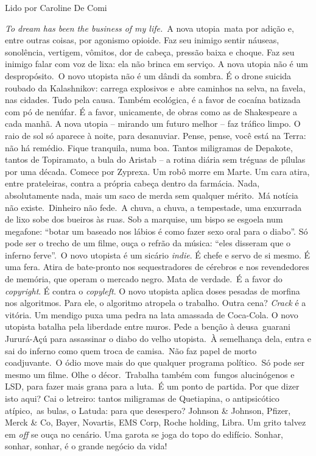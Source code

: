 Lido por Caroline De Comi

\bigskip

\emph{To dream has been the business of my life.}~A nova utopia~mata por
adição e, entre outras coisas, por agonismo opioide. Faz seu inimigo
sentir náuseas, sonolência, vertigem, vômitos, dor de cabeça, pressão
baixa e choque. Faz seu inimigo falar com voz de lixa: ela não brinca em
serviço. A nova utopia não é um despropósito.~O novo utopista não é um
dândi da sombra. É o drone suicida roubado da Kalashnikov: carrega
explosivos e~abre caminhos na selva, na favela, nas cidades. Tudo pela
causa. Também ecológica, é a favor de cocaína batizada com pó de
nenúfar. É a favor, unicamente, de obras como as de Shakespeare a cada
manhã. A nova utopia -- mirando um futuro melhor -- faz tráfico limpo. O
raio de sol só aparece à noite, para desanuviar. Pense, pense, você está
na Terra: não há remédio. Fique tranquila, numa boa. Tantos miligramas
de Depakote, tantos de Topiramato, a bula do Aristab -- a rotina diária
sem tréguas de pílulas por uma década. Comece por Zyprexa. Um robô morre
em Marte. Um cara atira, entre prateleiras, contra a própria cabeça
dentro da farmácia. Nada, absolutamente nada, mais um saco de merda sem
qualquer mérito.~Má notícia não existe.~Dinheiro não fede.~A chuva, a
chuva, a tempestade, uma enxurrada de lixo sobe dos bueiros às ruas. Sob
a marquise, um bispo se esgoela num megafone: ``botar um baseado nos
lábios é como fazer sexo oral para o diabo''. Só pode ser o trecho de um
filme, ouça o refrão da música: ``eles disseram que o inferno ferve''.~O
novo utopista é um sicário \emph{indie}. É chefe e servo de si mesmo. É
uma fera. Atira de bate-pronto nos sequestradores de cérebros e nos
revendedores de memória, que operam o mercado negro. Mata de verdade.~É
a favor do \emph{copyright}. É contra o \emph{copyleft}. O novo utopista
aplica doses pesadas de morfina nos algoritmos. Para ele, o algoritmo
atropela o trabalho. Outra cena? \emph{Crack} é a vitória. Um mendigo
puxa uma pedra na lata amassada de Coca-Cola. O novo utopista batalha
pela liberdade entre muros. Pede a benção à deusa~guarani Jururá-Açú
para assassinar o diabo do velho utopista.~À semelhança dela, entra e
sai do inferno como quem troca de camisa.~Não faz papel de morto
coadjuvante.~O ódio move mais do que qualquer programa político.~Só pode
ser mesmo um filme. Olhe o décor.~Trabalha também com~fungos
alucinógenos e LSD, para fazer mais grana para a luta.~É um ponto de
partida. Por que dizer isto aqui? Cai o letreiro: tantos miligramas de
Quetiapina, o antipsicótico atípico,~as bulas, o Latuda: para que
desespero? Johnson \& Johnson, Pfizer, Merck \& Co, Bayer, Novartis, EMS
Corp, Roche holding, Libra. Um grito talvez em \emph{off} se ouça no
cenário. Uma garota se joga do topo do edifício. Sonhar, sonhar, sonhar,
é o grande negócio da vida!

